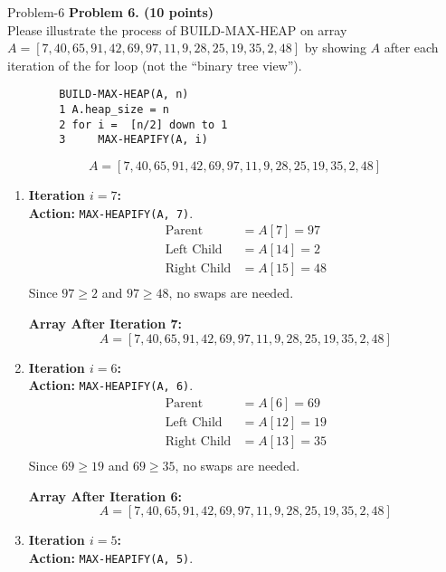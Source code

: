 \begin{problem}{}{Problem-6}
	\textbf{Problem 6. (10 points)} \\
	Please illustrate the process of BUILD-MAX-HEAP on array \( A = [7, 40, 65, 91, 42, 69, 97, 11, 9, 28, 25, 19, 35, 2, 48] \) by showing \( A \) after each iteration of the for loop (not the “binary tree view”).
	
	\begin{verbatim}
		BUILD-MAX-HEAP(A, n)
		1 A.heap_size = n
		2 for i =  [n/2] down to 1
		3     MAX-HEAPIFY(A, i)
	\end{verbatim}
	\[
	A = [7, 40, 65, 91, 42, 69, 97, 11, 9, 28, 25, 19, 35, 2, 48]
	\]
	
	\begin{enumerate}[label=(\roman*)]
		\item \textbf{Iteration \( i = 7 \):} \\
		\textbf{Action:}  \texttt{MAX-HEAPIFY(A, 7)}. \\
		
		\[
		\begin{aligned}
			\text{Parent} &= A[7] = 97 \\
			\text{Left Child} &= A[14] = 2 \\
			\text{Right Child} &= A[15] = 48 \\
		\end{aligned}
		\]
		Since \( 97 \geq 2 \) and \( 97 \geq 48 \), no swaps are needed.
		
		\textbf{Array After Iteration 7:}
		\[
		A = [7, 40, 65, 91, 42, 69, 97, 11, 9, 28, 25, 19, 35, 2, 48]
		\]
		
		\item \textbf{Iteration \( i = 6 \):} \\
		\textbf{Action:}  \texttt{MAX-HEAPIFY(A, 6)}. \\
		
		\[
		\begin{aligned}
			\text{Parent} &= A[6] = 69 \\
			\text{Left Child} &= A[12] = 19 \\
			\text{Right Child} &= A[13] = 35 \\
		\end{aligned}
		\]
		Since \( 69 \geq 19 \) and \( 69 \geq 35 \), no swaps are needed.
		
		\textbf{Array After Iteration 6:}
		\[
		A = [7, 40, 65, 91, 42, 69, 97, 11, 9, 28, 25, 19, 35, 2, 48]
		\]
		
		\item \textbf{Iteration \( i = 5 \):} \\
		\textbf{Action:}  \texttt{MAX-HEAPIFY(A, 5)}. \\
		

\end{enumerate}
\end{problem}
